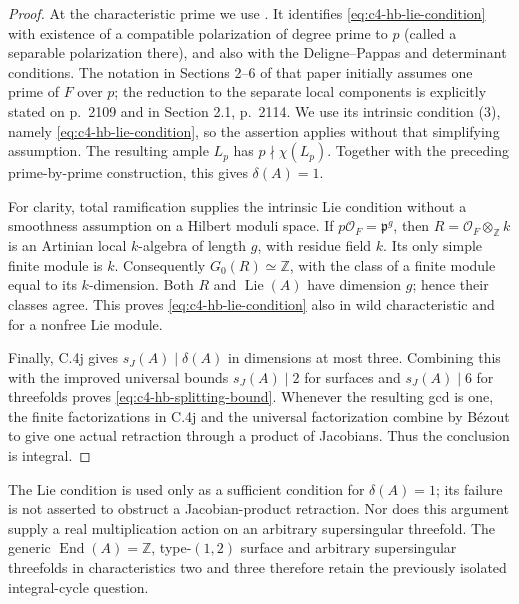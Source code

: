 \begin{proof}
At the characteristic prime we use
\citet[Proposition 2.8, p.~2118]{frC4Yu2003HB}.
It identifies \eqref{eq:c4-hb-lie-condition} with existence
of a compatible polarization of degree prime to \(p\)
(called a separable polarization there), and also with
the Deligne--Pappas and determinant conditions.
The notation in Sections 2--6 of that paper initially
assumes one prime of \(F\) over \(p\); the reduction to
the separate local components is explicitly stated on
p.~2109 and in Section 2.1, p.~2114.
We use its intrinsic condition (3), namely
\eqref{eq:c4-hb-lie-condition}, so the assertion applies
without that simplifying assumption.
The resulting ample \(L_p\) has \(p\nmid\chi(L_p)\).
Together with the preceding prime-by-prime construction,
this gives \(\delta(A)=1\).

For clarity, total ramification supplies the intrinsic
Lie condition without a smoothness assumption on a
Hilbert moduli space. If \(p\mathcal O_F=\mathfrak p^g\),
then \(R=\mathcal O_F\otimes_{\mathbb Z}k\) is an
Artinian local \(k\)-algebra of length \(g\), with residue
field \(k\). Its only simple finite module is \(k\).
Consequently \(G_0(R)\simeq\mathbb Z\), with the class
of a finite module equal to its \(k\)-dimension.
Both \(R\) and \(\operatorname{Lie}(A)\) have dimension
\(g\); hence their classes agree. This proves
\eqref{eq:c4-hb-lie-condition} also in wild
characteristic and for a nonfree Lie module.

Finally, C.4j gives \(s_J(A)\mid\delta(A)\) in dimensions
at most three. Combining this with the improved
universal bounds \(s_J(A)\mid2\) for surfaces and
\(s_J(A)\mid6\) for threefolds proves
\eqref{eq:c4-hb-splitting-bound}.
Whenever the resulting gcd is one, the finite
factorizations in C.4j and the universal factorization
combine by Bézout to give one actual retraction through
a product of Jacobians. Thus the conclusion is integral.
\end{proof}

The Lie condition is used only as a sufficient condition
for \(\delta(A)=1\); its failure is not asserted to
obstruct a Jacobian-product retraction. Nor does this
argument supply a real multiplication action on an
arbitrary supersingular threefold. The generic
\(\operatorname{End}(A)=\mathbb Z\), type-\((1,2)\)
surface and arbitrary supersingular threefolds in
characteristics two and three therefore retain the
previously isolated integral-cycle question.

